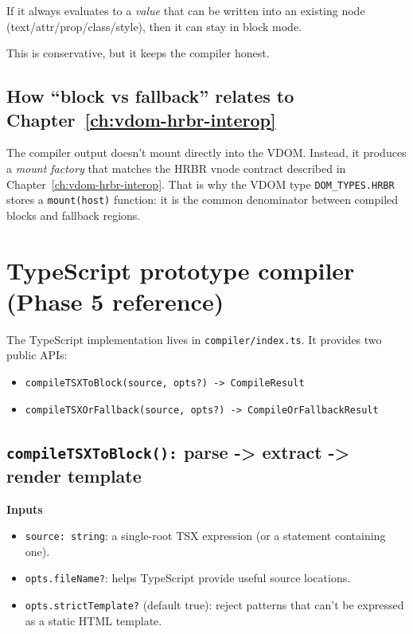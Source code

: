 If it always evaluates to a \emph{value} that can be written into an existing node (text/attr/prop/class/style), then it can stay in block mode.

This is conservative, but it keeps the compiler honest.

\subsection{How ``block vs fallback'' relates to Chapter~\ref{ch:vdom-hrbr-interop}}

The compiler output doesn't mount directly into the VDOM. Instead, it produces a \emph{mount factory} that matches the HRBR vnode contract described in Chapter~\ref{ch:vdom-hrbr-interop}.
That is why the VDOM type \texttt{DOM\_TYPES.HRBR} stores a \texttt{mount(host)} function: it is the common denominator between compiled blocks and fallback regions.

\section{TypeScript prototype compiler (Phase 5 reference)}

The TypeScript implementation lives in \texttt{compiler/index.ts}.
It provides two public APIs:

\begin{itemize}
\item \texttt{compileTSXToBlock(source, opts?) -> CompileResult}
\item \texttt{compileTSXOrFallback(source, opts?) -> CompileOrFallbackResult}
\end{itemize}

\subsection{\texttt{compileTSXToBlock():} parse -> extract -> render template}

\textbf{Inputs}

\begin{itemize}
\item \texttt{source: string}: a single-root TSX expression (or a statement containing one).
\item \texttt{opts.fileName?}: helps TypeScript provide useful source locations.
\item \texttt{opts.strictTemplate?} (default true): reject patterns that can't be expressed as a static HTML template.
\end{itemize}

